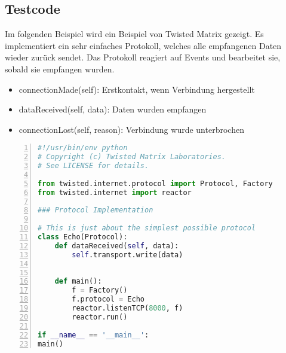 \subsection{Testcode}
Im folgenden Beispiel wird ein Beispiel von Twisted Matrix gezeigt. Es implementiert ein sehr einfaches Protokoll, welches alle empfangenen Daten wieder zurück sendet. Das Protokoll reagiert auf Events und bearbeitet sie, sobald sie empfangen wurden.
\begin{itemize}
\item connectionMade(self): Erstkontakt, wenn Verbindung hergestellt
\item dataReceived(self, data): Daten wurden empfangen
\item connectionLost(self, reason): Verbindung wurde unterbrochen
\end{itemize}
\begin{lstlisting}[caption =Testcode Echoserver mit Twisted Framework, language=python, frame=single, breaklines=true,columns=fullflexible, commentstyle=\color{gray}\upshape, captionpos=b, numbers = left]
#!/usr/bin/env python
# Copyright (c) Twisted Matrix Laboratories.
# See LICENSE for details.

from twisted.internet.protocol import Protocol, Factory
from twisted.internet import reactor

### Protocol Implementation

# This is just about the simplest possible protocol
class Echo(Protocol):
	def dataReceived(self, data):
		self.transport.write(data)


	def main():
		f = Factory()
		f.protocol = Echo
		reactor.listenTCP(8000, f)
		reactor.run()

if __name__ == '__main__':
main()
\end{lstlisting}




